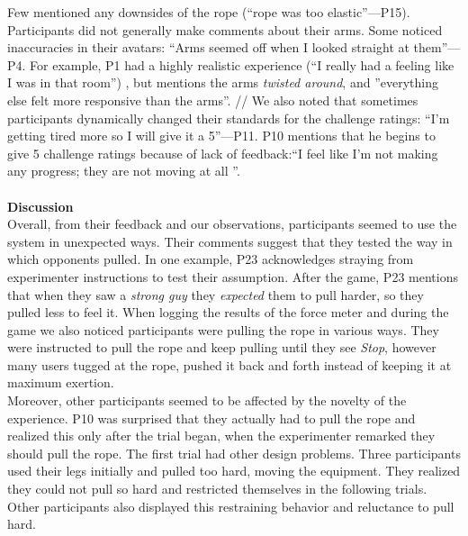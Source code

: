 Few mentioned any downsides of the rope (``rope was too elastic''---P15).\\
Participants did not generally make comments about their arms. Some noticed inaccuracies in their avatars: ``Arms seemed off when I looked straight at them''---P4. For example, P1 had a highly realistic experience (``I really had a feeling like I was in that room'') , but mentions the arms \textit{twisted around}, and ''everything else felt more responsive than the arms''. //
We also noted that sometimes participants dynamically changed their standards for the challenge ratings: ``I'm getting tired more so I will give it a 5''---P11. P10 mentions that he begins to give 5 challenge ratings because of lack of feedback:``I feel like I'm not making any progress; they are not moving at all ''.\\
\\
\textbf{Discussion}\\
Overall, from their feedback and our observations, participants seemed to use the system in unexpected ways. Their comments 
suggest that they tested the way in which opponents pulled. In one example, P23 acknowledges straying from experimenter instructions to test their assumption. After the game, P23 mentions that when they saw a \textit{strong guy} they \textit{expected} them to pull harder, so they pulled less to feel it. When logging the results of the force meter and during the game we also noticed participants were pulling the rope in various ways. They were instructed to pull the rope and keep pulling until they see \textit{Stop}, however many  users tugged at the rope, pushed it back and forth instead of keeping it at maximum exertion.\\
Moreover, other participants  seemed to be affected by the novelty of the experience. P10 was surprised that they actually had to pull the rope and realized this only after the trial began, when the experimenter remarked they should pull the rope. The first trial had other design problems. Three participants used their legs initially and pulled too hard, moving the equipment. They realized they could not pull so hard and restricted themselves in the following trials. Other participants also displayed this restraining behavior and reluctance to pull hard.
